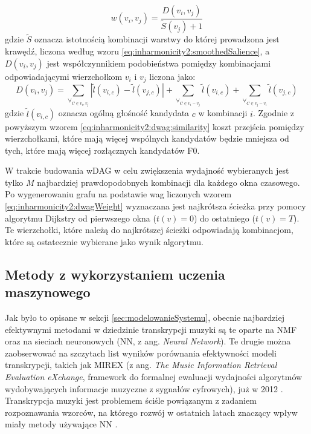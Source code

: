\documentclass[12pt,a4paper,twoside]{mwart}
\begin{document}
\begin{equation}\label{eq:inharmonicity2:dwagWeight}
w(v_i, v_j) = \frac{D(v_i, v_j)}{\widetilde{S}(v_j) + 1}
\end{equation}
gdzie $\widetilde{S}$ oznacza istotnością kombinacji warstwy do której prowadzona jest krawędź, liczona według wzoru \ref{eq:inharmonicity2:smoothedSalience}, a $D(v_i, v_j)$ jest współczynnikiem podobieństwa pomiędzy kombinacjami odpowiadającymi wierzchołkom $v_i$ i $v_j$ liczona jako:
\begin{equation}\label{eq:inharmonicity2:dwag:similarity}
D(v_i, v_j) = \sum_{\forall_{C\in v_i, v_j}}\left|\widetilde{l}(v_{i,c}) - \widetilde{l}(v_{j,c}) \right| + \sum_{\forall_{C\in v_i - v_j}}\widetilde{l}(v_{i,c}) + \sum_{\forall_{C\in v_j - v_i}}\widetilde{l}(v_{j,c})
\end{equation}
gdzie $\widetilde{l}(v_{i,c})$ oznacza ogólną głośność kandydata $c$ w kombinacji $i$. Zgodnie z powyższym wzorem \ref{eq:inharmonicity2:dwag:similarity} koszt przejścia pomiędzy wierzchołkami, które mają więcej wspólnych kandydatów będzie mniejsza od tych, które mają więcej rozłącznych kandydatów F0.

W trakcie budowania wDAG w celu zwiększenia wydajność wybieranych jest tylko $M$ najbardziej prawdopodobnych kombinacji dla każdego okna czasowego. Po wygenerowaniu grafu na podstawie wag liczonych wzorem \ref{eq:inharmonicity2:dwagWeight} wyznaczana jest najkrótsza ścieżka przy pomocy algorytmu Dijkstry \cite[269–271]{Transcription:Dijkstra:Graphs} od pierwszego okna ($t(v) = 0$) do ostatniego ($t(v) = T$). Te wierzchołki, które należą do najkrótszej ścieżki odpowiadają kombinacjom, które są ostatecznie wybierane jako wynik algorytmu.

\subsection{Metody z wykorzystaniem uczenia maszynowego}
Jak było to opisane w sekcji \ref{sec:modelowanieSystemu}, obecnie najbardziej efektywnymi metodami w dziedzinie transkrypcji muzyki są te oparte na NMF oraz na sieciach neuronowych (NN, z ang. \textit{Neural Network}). Te drugie można zaobserwować na szczytach list wyników porównania efektywności modeli transkrypcji, takich jak MIREX (z ang. \textit{The Music Information Retrieval Evaluation eXchange}, framework do formalnej ewaluacji wydajności algorytmów wydobywających informacje muzyczne z sygnałów cyfrowych), już w 2012 \cite[8-9]{Transcription:Klapuri:ChallengesAndFuture}. Transkrypcja muzyki jest problemem ściśle powiązanym z zadaniem rozpoznawania wzorców, na którego rozwój w ostatnich latach znaczący wpływ miały metody używające NN \cite[6-8]{DBLP:journals/spm/BenetosDDE19}.
\end{document}
